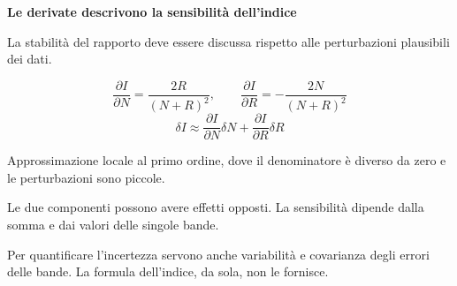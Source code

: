 \documentclass[12pt,aspectratio=1610]{beamer}
\newcommand{\PBody}[1]{\par{\fontsize{11.3}{14.8}\selectfont #1\par}}
\newcommand{\PSmall}[1]{\par{\fontsize{9.8}{13.1}\selectfont #1\par}}
\newcommand{\PInfo}[1]{%
\begin{tcolorbox}[enhanced,arc=1.6mm,boxrule=.55pt,colback=GeoTint,
 colframe=Rule!80!Classical,left=2.3mm,right=2.3mm,top=2mm,bottom=2mm,
 before skip=1mm,after skip=1mm]
\PSmall{#1}\end{tcolorbox}}
\begin{document}
\begin{frame}[plain]\hypertarget{slide85}{}
\begin{lrbox}{\TitleBox}
\begin{minipage}[t]{17.7cm}\raggedright\color{Ink}\fontsize{11.3}{14.8}\selectfont
\color{Navy}\bfseries\fontsize{20.6}{24.5}\selectfont Le derivate descrivono la sensibilità dell’indice
\end{minipage}\end{lrbox}

\begin{lrbox}{\RecallBox}
\begin{minipage}[t]{14.3cm}\raggedright\color{Ink}\fontsize{11.3}{14.8}\selectfont
\fontsize{10.3}{13.8}\selectfont La stabilità del rapporto deve essere discussa rispetto alle perturbazioni plausibili dei dati.
\end{minipage}\end{lrbox}

\begin{lrbox}{\PilotLeftBox}
\begin{minipage}[t]{10.05cm}\raggedright\color{Ink}\fontsize{11.3}{14.8}\selectfont
\[\frac{\partial I}{\partial N}=\frac{2R}{(N+R)^2},
       \qquad
       \frac{\partial I}{\partial R}=-\frac{2N}{(N+R)^2}\]
\[\delta I\approx
      \frac{\partial I}{\partial N}\delta N+
      \frac{\partial I}{\partial R}\delta R\]
\PInfo{Approssimazione locale al primo ordine, dove il denominatore è diverso da zero e le perturbazioni sono piccole.}

\end{minipage}\end{lrbox}

\begin{lrbox}{\PilotRightBox}
\begin{minipage}[t]{7.55cm}\raggedright\color{Ink}\fontsize{11.3}{14.8}\selectfont
\PBody{Le due componenti possono avere effetti opposti. La sensibilità dipende dalla somma e dai valori delle singole bande.}
\vspace{2.5mm}
\PBody{Per quantificare l’incertezza servono anche variabilità e covarianza degli errori delle bande. La formula dell’indice, da sola, non le fornisce.}
\vspace{2.5mm}


\end{minipage}
\end{lrbox}
\end{frame}
\end{document}
